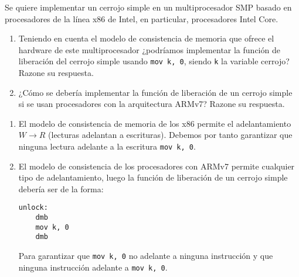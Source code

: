 \begin{ejercicio}
    Se quiere implementar un cerrojo simple en un multiprocesador SMP basado en procesadores de la línea x86 de Intel, en particular, procesadores Intel Core. 
    \begin{enumerate}
        \item Teniendo en cuenta el modelo de consistencia de memoria que ofrece el hardware de este multiprocesador ¿podríamos implementar la función de liberación del cerrojo simple usando \verb|mov k, 0|, siendo \verb|k| la variable cerrojo? Razone su respuesta.
        \item ¿Cómo se debería implementar la función de liberación de un cerrojo simple si se usan procesadores con la arquitectura ARMv7? Razone su respuesta.
    \end{enumerate}

    \begin{enumerate}
        \item El modelo de consistencia de memoria de los x86 permite el adelantamiento $W\rightarrow R$ (lecturas adelantan a escrituras). Debemos por tanto garantizar que ninguna lectura adelante a la escritura \verb|mov k, 0|.
        \item El modelo de consistencia de los procesadores con ARMv7 permite cualquier tipo de adelantamiento, luego la función de liberación de un cerrojo simple debería ser de la forma:
            \begin{listing}[H]
            \begin{verbatim}
unlock:
    dmb
    mov k, 0
    dmb
            \end{verbatim}
            \end{listing}
        Para garantizar que \verb|mov k, 0| no adelante a ninguna instrucción y que ninguna instrucción adelante a \verb|mov k, 0|.
    \end{enumerate}
\end{ejercicio}

